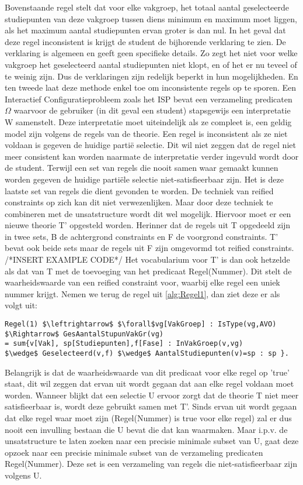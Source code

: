 Bovenstaande regel stelt dat voor elke vakgroep, het totaal aantal geselecteerde studiepunten van deze vakgroep tussen diens minimum en maximum moet liggen, als het maximum aantal studiepunten ervan groter is dan nul. In het geval dat deze regel inconsistent is krijgt de student de bijhorende verklaring te zien. De verklaring is algemeen en geeft geen specifieke details. Zo zegt het niet voor welke vakgroep het geselecteerd aantal studiepunten niet klopt, en of het er nu teveel of te weinig zijn. Dus de verklaringen zijn redelijk beperkt in hun mogelijkheden. En ten tweede laat deze methode enkel toe om inconsistente regels op te sporen. Een Interactief Configuratieprobleem zoals het ISP bevat een verzameling predicaten $\Omega$ waarvoor de gebruiker (in dit geval een student) stapsgewijs een interpretatie W samenstelt. Deze interpretatie moet uiteindelijk als ze compleet is, een geldig model zijn volgens de regels van de theorie. Een regel is inconsistent als ze niet voldaan is gegeven de huidige parti\"{e} selectie. Dit wil niet zeggen dat de regel niet meer consistent kan worden naarmate de interpretatie verder ingevuld wordt door de student. Terwijl een set van regels die nooit samen waar gemaakt kunnen worden gegeven de huidige parti\"{e}le selectie niet-satisfieerbaar zijn. Het is deze laatste set van regels die dient gevonden te worden. De techniek van reified constraints op zich kan dit niet verwezenlijken. Maar door deze techniek te combineren met de unsatstructure wordt dit wel mogelijk. Hiervoor moet er een nieuwe theorie T' opgesteld worden. Herinner dat de regels uit T opgedeeld zijn in twee sets, B de achtergrond constraints en F de voorgrond constraints. T' bevat ook beide sets maar de regels uit F zijn omgevormd tot reified constraints. 
/*INSERT EXAMPLE CODE*/
Het vocabularium voor T' is dan ook hetzelde als dat van T met de toevoeging van het predicaat Regel(Nummer). Dit stelt de waarheidswaarde van een reified constraint voor, waarbij elke regel een uniek nummer krijgt. Nemen we terug de regel uit \ref{alg:Regel1}, dan ziet deze er als volgt uit: 
\begin{lstlisting}[mathescape, caption=IDP Reified Constraint Example 2, frame=single]
Regel(1) $\leftrightarrow$ $\forall$vg[VakGroep] : IsType(vg,AVO) $\Rightarrow$ GesAantalStupunVakGr(vg) 
= sum{v[Vak], sp[Studiepunten],f[Fase] : InVakGroep(v,vg) 
$\wedge$ Geselecteerd(v,f) $\wedge$ AantalStudiepunten(v)=sp : sp }.
\end{lstlisting}
Belangrijk is dat de waarheidswaarde van dit predicaat voor elke regel op 'true' staat, dit wil zeggen dat ervan uit wordt gegaan dat aan elke regel voldaan moet worden. Wanneer blijkt dat een selectie U ervoor zorgt dat de theorie T niet meer satisfieerbaar is, wordt deze gebruikt samen met T'. Sinds ervan uit wordt gegaan dat elke regel waar moet zijn (Regel(Nummer) is true voor elke regel) zal er dus nooit een invulling bestaan die U bevat die dat kan waarmaken. Maar i.p.v. de unsatstructure te laten zoeken naar een precisie minimale subset van U, gaat deze opzoek naar een precisie minimale subset van de verzameling predicaten Regel(Nummer). Deze set is een verzameling van regels die niet-satisfieerbaar zijn volgens U.

